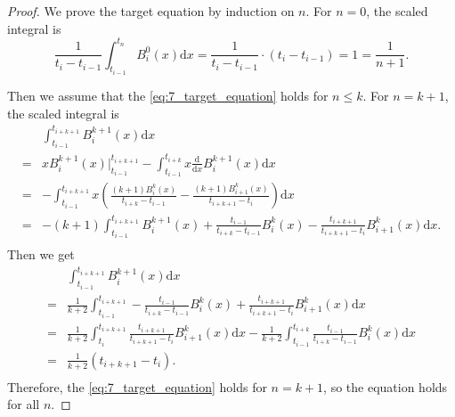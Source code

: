 \documentclass[a4paper]{article}
\begin{document}
\begin{proof}
  We prove the target equation by induction on $n$. For $n = 0$, the scaled integral is 
  \begin{equation}
    \frac{1}{t_i - t_{i - 1}} \int_{t_{i - 1}}^{t_n} B_i^0(x) \mathrm{d}x = \frac{1}{t_i - t_{i - 1}} \cdot (t_i - t_{i - 1}) = 1 = \frac{1}{n + 1}.
    \label{eq:7_scaled_integral_n_0}
  \end{equation}

  Then we assume that the \cref{eq:7_target_equation} holds for $n \leqslant k$. For $n = k + 1$, the scaled integral is
  \begin{equation}
    \begin{aligned}
      & \int_{t_{i - 1}}^{t_{i + k + 1}} B_i^{k + 1}(x) \mathrm{d}x \\
      =& x B_i^{k + 1}(x) \big|_{t_{i - 1}}^{t_{i + k + 1}} - \int_{t_{i - 1}}^{t_{i + k}} x \frac{\mathrm{d}}{\mathrm{d}x} B_i^{k + 1}(x) \mathrm{d}x \\
      =& - \int_{t_{i - 1}}^{t_{i + k + 1}} x \left(\frac{(k + 1)B_i^k(x)}{t_{i + k} - t_{i - 1}} - \frac{(k + 1)B_{i + 1}^k(x)}{t_{i + k + 1} - t_i}\right) \mathrm{d}x \\
      =& -(k + 1) \int_{t_{i - 1}}^{t_{i + k + 1}} B_i^{k + 1}(x) + \frac{t_{i - 1}}{t_{i + k} - t_{i - 1}}B_i^k(x) - \frac{t_{i + k + 1}}{t_{i + k + 1} - t_i} B_{i + 1}^k(x) \mathrm{d}x. \\
    \end{aligned}
    \label{eq:7_scaled_integral_n_k+1}
  \end{equation}
  Then we get
  \begin{equation}
    \begin{aligned}
      & \int_{t_{i - 1}}^{t_{i + k + 1}} B_i^{k + 1}(x) \mathrm{d}x \\
      =& \frac{1}{k + 2} \int_{t_{i - 1}}^{t_{i + k + 1}} -\frac{t_{i - 1}}{t_{i + k} - t_{i - 1}}B_i^k(x) + \frac{t_{i + k + 1}}{t_{i + k + 1} - t_i} B_{i + 1}^k(x) \mathrm{d}x \\
      =& \frac{1}{k + 2} \int_{t_i}^{t_{i + k + 1}} \frac{t_{i + k + 1}}{t_{i + k + 1} - t_i} B_{i + 1}^k(x) \mathrm{d}x - \frac{1}{k + 2} \int_{t_{i - 1}}^{t_{i + k}} \frac{t_{i - 1}}{t_{i + k} - t_{i - 1}}B_i^k(x) \mathrm{d}x \\
      =& \frac{1}{k + 2} (t_{i + k + 1} - t_i). \\
    \end{aligned}
    \label{eq:7_scaled_integral_n_k+1_2}
  \end{equation}
  Therefore, the \cref{eq:7_target_equation} holds for $n = k + 1$, so the equation holds for all $n$.
\end{proof}
\end{document}
